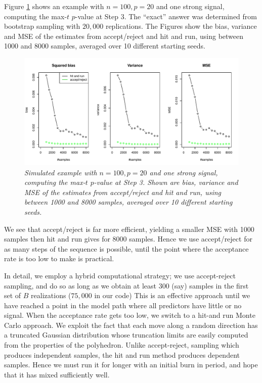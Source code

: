 \documentclass{article}
\begin{document}
Figure \ref{fig:comparison} shows an example with $n=100, p=20$ and one strong signal, computing the max-$t$ $p$-value at Step 3.
The ``exact'' answer  was determined from bootstrap sampling with $20,000$ replications.
The Figures show the bias, variance and MSE of the estimates from accept/reject and hit and run, using between 1000 and 8000 samples, averaged
over 10 different starting seeds.
\begin{figure}[htp]
\centering
  \includegraphics[width=\textwidth]{figs/comparison.pdf}
  \caption{\em Simulated example with $n= 100, p=20$ and one strong signal, computing the max-$t$ $p$-value at Step 3.  Shown are bias, variance and MSE of the estimates from accept/reject and hit and run, using between 1000 and 8000 samples, averaged
over 10 different starting seeds.
}
  \label{fig:comparison}
\end{figure}
We see that accept/reject is far more efficient, yielding a smaller MSE with 1000 samples then hit and run gives for  8000 samples.
Hence we use accept/reject for as many steps of the sequence is possible,  until the point where the acceptance rate is too low to make is practical.

In detail, we employ a hybrid computational strategy; we use accept-reject sampling, and do so as long as we obtain at least 300 (say) samples in the first set
of $B$ realizations ($75,000$ in our code)  This is an effective approach until we have reached a point in the model path where all predictors have little or no signal.
When the acceptance rate gets too low, we switch to a hit-and run Monte Carlo approach. We exploit the fact that each move along a random direction 
has a truncated Gaussian distribution whose truncation limits are easily computed from the properties of the polyhedron. Unlike accept-reject, sampling
which produces independent samples,  the hit and run method produces dependent samples. Hence we must run it for longer with an initial burn in period,
and hope that it has mixed sufficiently well.
\end{document}
